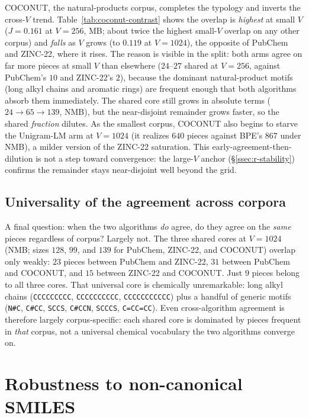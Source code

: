 \documentclass{article}
\begin{document}
COCONUT, the natural-products corpus, completes the typology and inverts the
cross-$V$ trend. Table~\ref{tab:coconut-contrast} shows the overlap is
\emph{highest} at small $V$ ($J{=}0.161$ at $V{=}256$, MB; about twice the
highest small-$V$ overlap on any other corpus) and \emph{falls} as $V$ grows (to
$0.119$ at $V{=}1024$), the opposite of PubChem and ZINC-22, where it rises. The
reason is visible in the split: both arms agree on far more pieces at small $V$
than elsewhere ($24$--$27$ shared at $V{=}256$, against PubChem's $10$ and
ZINC-22's $2$), because the dominant natural-product motifs (long alkyl chains
and aromatic rings) are frequent enough that both algorithms absorb them
immediately. The shared core still grows in absolute terms ($24 \to 65 \to 139$,
NMB), but the near-disjoint remainder grows faster, so the shared \emph{fraction}
dilutes. As the smallest corpus, COCONUT also begins to starve the Unigram-LM arm
at $V{=}1024$ (it realizes $640$ pieces against BPE's $867$ under NMB), a milder
version of the ZINC-22 saturation. This early-agreement-then-dilution is not a
step toward convergence: the large-$V$ anchor (\S\ref{ssec:r-stability}) confirms
the remainder stays near-disjoint well beyond the grid.

\subsection{Universality of the agreement across corpora}\label{app:cross-corpus}

A final question: when the two algorithms \emph{do} agree, do they agree on the
\emph{same} pieces regardless of corpus? Largely not. The three
shared cores at $V{=}1024$ (NMB; sizes $128$, $99$, and $139$ for PubChem,
ZINC-22, and COCONUT) overlap only weakly: $23$ pieces between PubChem and
ZINC-22, $31$ between PubChem and COCONUT, and $15$ between ZINC-22 and COCONUT.
Just $9$ pieces belong to all three cores. That universal core is chemically
unremarkable: long alkyl
chains (\texttt{CCCCCCCCC}, \texttt{CCCCCCCCCC}, \texttt{CCCCCCCCCCC}) plus a
handful of generic motifs (\texttt{N\#C}, \texttt{C\#CC}, \texttt{SCCS},
\texttt{C\#CCN}, \texttt{SCCCS}, \texttt{C=CC=CC}). Even cross-algorithm agreement
is therefore largely corpus-specific: each shared core is dominated by pieces
frequent in \emph{that} corpus, not a universal chemical vocabulary the two
algorithms converge on.

\section{Robustness to non-canonical SMILES}\label{app:robustness}\label{app:noncanon}
\end{document}
